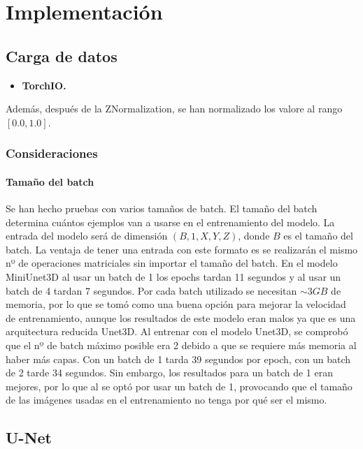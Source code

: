 \chapter{Implementación}\label{implementacion}

\section{Carga de datos}\label{sec:data_loading_processing}
\begin{itemize}
\item \textbf{TorchIO.} 

\end{itemize}
Además, después de la ZNormalization, se han normalizado los valore al rango $[0.0, 1.0]$.  

\subsection{Consideraciones}

\subsubsection{Tamaño del batch}

Se han hecho pruebas con varios tamaños de batch. El tamaño del batch determina cuántos ejemplos van a usarse en el entrenamiento del modelo. La entrada del modelo será de dimensión $(B,1,X,Y,Z)$, donde $B$ es el tamaño del batch. La ventaja de tener una entrada con este formato es se realizarán el mismo nº de operaciones matriciales sin importar el tamaño del batch. 
En el modelo MiniUnet3D al usar un batch de 1 los epochs tardan 11 segundos y al usar un batch de 4 tardan 7 segundos. Por cada batch utilizado se necesitan $\sim 3GB$ de memoria, por lo que se tomó como una buena opción para mejorar la velocidad de entrenamiento, aunque los resultados de este modelo eran malos ya que es una arquitectura reducida Unet3D.
Al entrenar con el modelo Unet3D, se comprobó que el nº de batch máximo posible era 2 debido a que se requiere más memoria al haber más capas. Con un batch de 1 tarda 39 segundos por epoch, con un batch de 2 tarde 34 segundos. Sin embargo, los resultados para un batch de 1 eran mejores, por lo que al se optó por usar un batch de 1, provocando que el tamaño de las imágenes usadas en el entrenamiento no tenga por qué ser el mismo.


\section{U-Net}\label{sec:unet_implementation}

